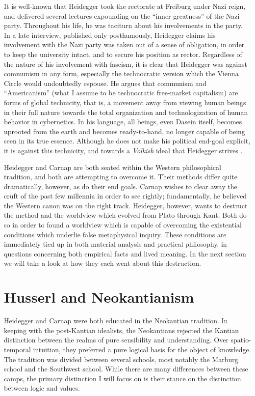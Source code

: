 \documentclass[leqno, 12pt]{turabian-researchpaper}
\begin{document}
	It is well-known that Heidegger took the rectorate at Freiburg under Nazi reign,
	and delivered several lectures expounding on the \enquote{inner greatness} of the
	Nazi party. Throughout his life, he was taciturn about his involvements in the
	party. In a late interview, published only posthumously, Heidegger claims his
	involvement with the Nazi party was taken out of a sense of obligation, in order
	to keep the university intact, and to secure his position as rector. Regardless
	of the nature of his involvement with fascism, it is clear that Heidegger was
	against communism in any form, especially the technocratic version which the Vienna
	Circle would undoubtedly espouse. He argues that communism and \enquote{Americanism}
	(what I assume to be technocratic free-market capitalism) are forms of global technicity,
	that is, a movement away from viewing human beings in their full nature towards
	the total organization and technologization of human behavior in cybernetics.
	In his language, all beings, even Dasein itself, becomes uprooted from the earth
	and becomes ready-to-hand, no longer capable of being seen in its true essence.
	Although he does not make his political end-goal explicit, it is against this
	technicity, and towards a \textit{Volkish} ideal that Heidegger strives
	\autocite{heidegger1981}.

	Heidegger and Carnap are both seated within the Western philosophical tradition,
	and both are attempting to overcome it. Their methods differ quite dramatically,
	however, as do their end goals. Carnap wishes to clear away the cruft of the
	past few millennia in order to see rightly; fundamentally, he believed the
	Western canon was on the right track. Heidegger, however, wants to destruct the
	method and the worldview which evolved from Plato through Kant. Both do so in
	order to found a worldview which is capable of overcoming the existential
	conditions which underlie false metaphysical inquiry. These conditions are immediately
	tied up in both material analysis and practical philosophy, in questions
	concerning both empirical facts and lived meaning. In the next section we will
	take a look at how they each went about this destruction.

	\section{Husserl and Neokantianism}

	Heidegger and Carnap were both educated in the Neokantian tradition. In keeping
	with the post-Kantian idealists, the Neokantians rejected the Kantian
	distinction between the realms of pure sensibility and understanding. Over spatio-temporal
	intuition, they preferred a pure logical basis for the object of knowledge. \autocite[28]{friedman2000}
	The tradition was divided between several schools, most notably the Marburg
	school and the Southwest school. While there are many differences between these
	camps, the primary distinction I will focus on is their stance on the
	distinction between logic and values.
\end{document}
